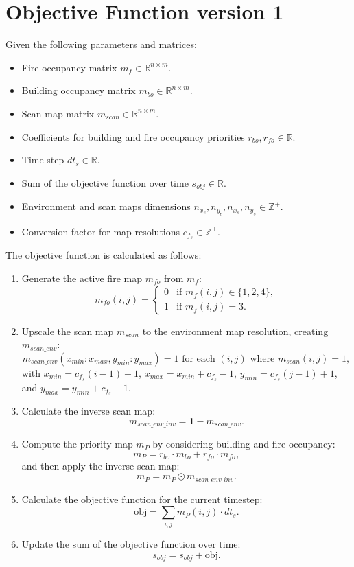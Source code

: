 \documentclass{article}
\begin{document}
\section*{Objective Function version 1}

Given the following parameters and matrices:
\begin{itemize}
    \item Fire occupancy matrix $m_f \in \mathbb{R}^{n \times m}$.
    \item Building occupancy matrix $m_{bo} \in \mathbb{R}^{n \times m}$.
    \item Scan map matrix $m_{scan} \in \mathbb{R}^{n \times m}$.
    \item Coefficients for building and fire occupancy priorities $r_{bo}, r_{fo} \in \mathbb{R}$.
    \item Time step $dt_s \in \mathbb{R}$.
    \item Sum of the objective function over time $s_{obj} \in \mathbb{R}$.
    \item Environment and scan maps dimensions $n_{x_e}, n_{y_e}, n_{x_s}, n_{y_s} \in \mathbb{Z}^+$.
    \item Conversion factor for map resolutions $c_{f_s} \in \mathbb{Z}^+$.
\end{itemize}

The objective function is calculated as follows:

\begin{enumerate}
    \item Generate the active fire map $m_{fo}$ from $m_f$:
    \[ m_{fo}(i,j) = 
    \begin{cases} 
        0 & \text{if } m_f(i,j) \in \{1, 2, 4\}, \\
        1 & \text{if } m_f(i,j) = 3.
    \end{cases} \]

    \item Upscale the scan map $m_{scan}$ to the environment map resolution, creating $m_{scan\_env}$:
    \[ m_{scan\_env}(x_{min}:x_{max}, y_{min}:y_{max}) = 1 \text{ for each }(i, j) \text{ where } m_{scan}(i, j) = 1, \]
    with $x_{min} = c_{f_s}(i-1) + 1$, $x_{max} = x_{min} + c_{f_s} - 1$, $y_{min} = c_{f_s}(j-1) + 1$, and $y_{max} = y_{min} + c_{f_s} - 1$.

    \item Calculate the inverse scan map:
    \[ m_{scan\_env\_inv} = \mathbf{1} - m_{scan\_env}. \]

    \item Compute the priority map $m_P$ by considering building and fire occupancy:
    \[ m_P = r_{bo} \cdot m_{bo} + r_{fo} \cdot m_{fo}, \]
    and then apply the inverse scan map:
    \[ m_P = m_P \odot m_{scan\_env\_inv}. \]

    \item Calculate the objective function for the current timestep:
    \[ \text{obj} = \sum_{i,j} m_P(i,j) \cdot dt_s. \]

    \item Update the sum of the objective function over time:
    \[ s_{obj} = s_{obj} + \text{obj}. \]
\end{enumerate}
\end{document}
